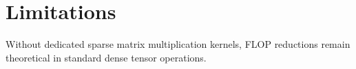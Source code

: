 \section{Limitations}Without dedicated sparse matrix multiplication kernels, FLOP reductions remain theoretical in standard dense tensor operations.
